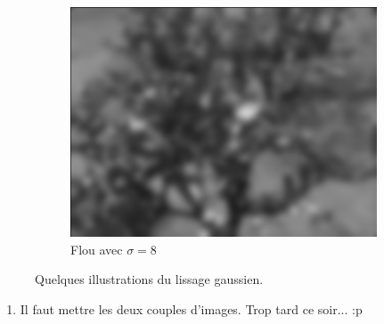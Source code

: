 \begin{enumerate}[questions, start=11]
\begin{figure}[!h]
\begin{subfigure}{0.3\textwidth}
  \includegraphics[width=\textwidth]{img/grove-blur-8.png}
  \caption{Flou avec $\sigma = 8$}
  \end{subfigure}
\caption{Quelques illustrations du lissage gaussien.}
\end{figure}
\end{enumerate}

\begin{enumerate}[questions, start=13]
\item Il faut mettre les deux couples d'images. Trop tard ce soir... :p
\end{enumerate}